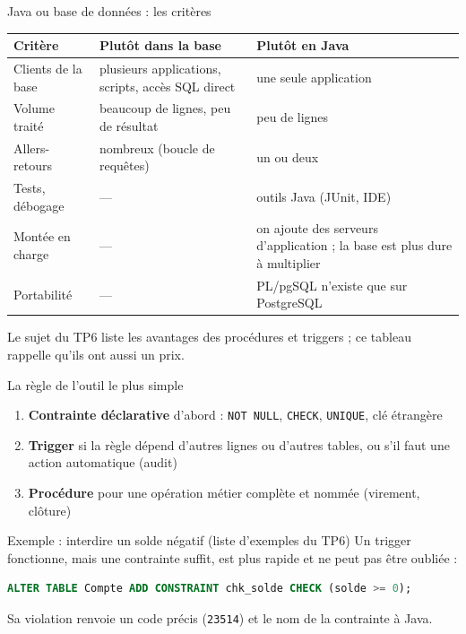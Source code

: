 \documentclass[aspectratio=169,10pt]{beamer}
\begin{document}
\begin{frame}{Java ou base de donn\'ees : les crit\`eres}
  \begin{datacard}
    \small
    \begin{tabular}{@{}p{3.6cm}p{4.3cm}p{4.3cm}@{}}
      \toprule
      \textbf{Crit\`ere} & \textbf{Plut\^ot dans la base} & \textbf{Plut\^ot en Java} \\
      \midrule
      Clients de la base & plusieurs applications, scripts, acc\`es SQL direct & une seule application \\
      Volume trait\'e & beaucoup de lignes, peu de r\'esultat & peu de lignes \\
      Allers-retours & nombreux (boucle de requ\^etes) & un ou deux \\
      Tests, d\'ebogage & --- & outils Java (JUnit, IDE) \\
      Mont\'ee en charge & --- & on ajoute des serveurs d'application ; la base est plus dure \`a multiplier \\
      Portabilit\'e & --- & PL/pgSQL n'existe que sur PostgreSQL \\
      \bottomrule
    \end{tabular}
  \end{datacard}
  \vspace{1mm}
  {\small\color{qamuted} Le sujet du TP6 liste les avantages des proc\'edures et triggers ; ce tableau rappelle qu'ils ont aussi un prix.}
\end{frame}

\begin{frame}[fragile]{La r\`egle de l'outil le plus simple}
  \begin{enumerate}
    \item \textbf{Contrainte d\'eclarative} d'abord : \texttt{NOT NULL}, \texttt{CHECK}, \texttt{UNIQUE}, cl\'e \'etrang\`ere
    \item \textbf{Trigger} si la r\`egle d\'epend d'autres lignes ou d'autres tables, ou s'il faut une action automatique (audit)
    \item \textbf{Proc\'edure} pour une op\'eration m\'etier compl\`ete et nomm\'ee (virement, cl\^oture)
  \end{enumerate}
  \vspace{2mm}
  \begin{exampleblock}{Exemple : \og interdire un solde n\'egatif \fg{} (liste d'exemples du TP6)}
    Un trigger fonctionne, mais une contrainte suffit, est plus rapide et ne peut pas \^etre oubli\'ee :
\begin{lstlisting}[language=SQL]
ALTER TABLE Compte ADD CONSTRAINT chk_solde CHECK (solde >= 0);
\end{lstlisting}
    Sa violation renvoie un code pr\'ecis (\texttt{23514}) et le nom de la contrainte \`a Java.
  \end{exampleblock}
\end{frame}
\end{document}
